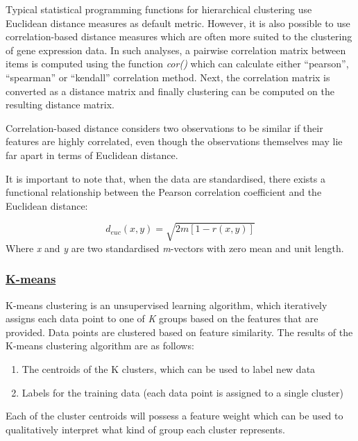 
Typical statistical programming functions for hierarchical clustering use Euclidean distance measures as default metric. However, it is also possible to use correlation-based distance measures which are often more suited to the clustering of gene expression data. In such analyses, a pairwise correlation matrix between items is computed using the function \textit{cor()} which can calculate either “pearson”, “spearman” or “kendall” correlation method. Next, the correlation matrix is converted as a distance matrix and finally clustering can be computed on the resulting distance matrix.

Correlation-based distance considers two observations to be similar if their features are highly correlated, even though the observations themselves may lie far apart in terms of Euclidean distance.

It is important to note that, when the data are standardised, there exists a functional relationship between the Pearson correlation coefficient and the Euclidean distance:

\begin{equation}
d_{euc}(x,y) = \sqrt{2m[1-r(x,y)]}
\end{equation}
Where \textit{x} and \textit{y} are two standardised \textit{m}-vectors with zero mean and unit length.

\subsubsection{\underline{K-means}}


K-means clustering is an unsupervised learning algorithm, which iteratively assigns each data point to one of \textit{K} groups based on the features that are provided. Data points are clustered based on feature similarity. The results of the K-means clustering algorithm are as follows:

\begin{enumerate}
    \item The centroids of the K clusters, which can be used to label new data
    \item Labels for the training data (each data point is assigned to a single cluster)
\end{enumerate}

Each of the cluster centroids will possess a feature weight which can be used to qualitatively interpret what kind of group each cluster represents.  

